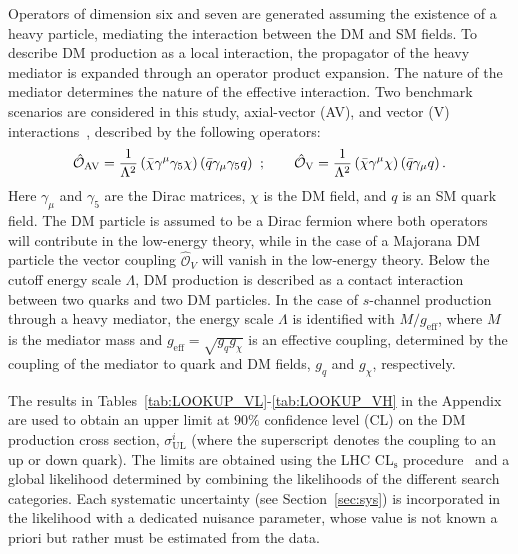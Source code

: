 Operators of dimension six and seven are generated assuming the
existence of a heavy particle, mediating the interaction between the
DM and SM fields. To describe DM production as a local interaction,
the propagator of the heavy mediator is expanded through an operator
product expansion. The nature of the mediator
determines the nature of the effective interaction. Two benchmark
scenarios are considered in this study, axial-vector (AV), and vector
(V) interactions~\cite{PhysRevD.85.056011}, described by the
following operators:
\begin{equation}
\label{eq:OvOva}
\hat{\mathcal{O}}_{\mathrm{AV}}
=
\frac{1}{\Lambda^{2}}\left(\bar{\chi}\gamma^{\mu}\gamma_{5}\chi\right)
\left(\bar{q}\gamma_{\mu}\gamma_{5}q\right) \hspace{0.05in};\qquad
\hat{\mathcal{O}}_{\mathrm{V}} =
\frac{1}{\Lambda^{2}}\left(\bar{\chi}\gamma^{\mu}\chi\right)
\left(\bar{q}\gamma_{\mu}q\right).
\end{equation}
Here  $\gamma_{\mu}$ and $\gamma_{5}$ are the Dirac matrices, $\chi$
is the DM field, and $q$ is an SM quark field. The DM particle is assumed to be a Dirac
fermion where both operators will contribute in the low-energy theory, while in the case of a Majorana DM particle the vector coupling
$\hat{\mathcal{O}}_{V}$ will vanish in the low-energy theory.
Below the cutoff energy
scale $\Lambda$, DM production is described as a contact interaction
between two quarks and two DM particles. In the case of $s$-channel
production through a heavy mediator, the energy scale $\Lambda$ is
identified with $M/g_\text{eff}$, where $M$ is the mediator mass and
$g_\text{eff} = \sqrt{g_{q} g_{\chi}}$ is an effective
coupling, determined by the coupling of the mediator to quark and DM
fields, $g_q$ and $g_\chi$, respectively.


The results in Tables~\ref{tab:LOOKUP_VL}-\ref{tab:LOOKUP_VH} in the
Appendix are used to obtain an upper limit at 90\% confidence level
(CL) on the DM production cross section, $\sigma^{i}_{\mathrm{UL}}$ (where
the superscript denotes the coupling to an up or down quark). The
limits are obtained using the
LHC CL$_\mathrm{s}$ procedure~\cite{LHC_CLS,CMS-NOTE-2011-005} and a global likelihood determined
by combining the likelihoods of the different search categories. Each
 systematic uncertainty (see Section~\ref{sec:sys}) is incorporated in the likelihood with a dedicated nuisance parameter, whose value is not known a priori but rather must be estimated from the data.

